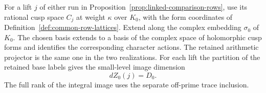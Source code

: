 \begin{proposition}
\label{prop:equivariant-selected-row}
For a lift \(j\) of either run in
Proposition~\ref{prop:linked-comparison-rows}, use its rational
cusp space \(C_j\) at weight \(\kappa\) over \(K_0\), with the
form coordinates of Definition~\ref{def:common-row-lattices}.
Extend along the complex embedding \(\sigma_0\) of \(K_0\). The chosen basis extends to a basis of the complex space of holomorphic cusp forms and identifies the corresponding character actions. The retained arithmetic projector is the same
one in the two realizations. For each lift the partition of the retained base labels gives the small-level image dimension
\[
 dZ_0(j)=D_0.
\]
 The full rank of the integral image uses the separate
off-prime trace inclusion.
\end{proposition}

